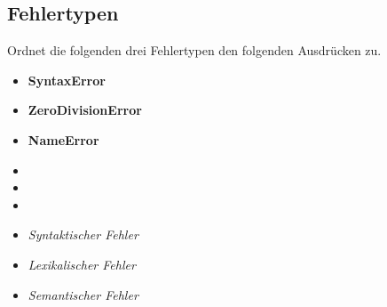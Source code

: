 \subsection{Fehlertypen }

Ordnet die folgenden drei Fehlertypen den folgenden Ausdrücken zu.
\begin{multicols}{3}
    \begin{itemize}
        \item[] \textbf{SyntaxError}
        \item[] \textbf{ZeroDivisionError}
        \item[] \textbf{NameError}
    \end{itemize}
    \begin{itemize}
        \item[] 
        \item[] 
        \item[] 
    \end{itemize}
    \begin{itemize}
        \item[] \textit{Syntaktischer Fehler}
        \item[] \textit{Lexikalischer Fehler}
        \item[] \textit{Semantischer Fehler}
    \end{itemize}
\end{multicols}
